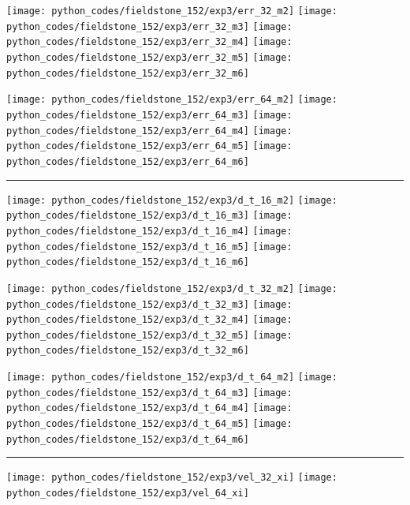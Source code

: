 \noindent
\texttt{[image: python\_codes/fieldstone\_152/exp3/err\_32\_m2]}
\texttt{[image: python\_codes/fieldstone\_152/exp3/err\_32\_m3]}
\texttt{[image: python\_codes/fieldstone\_152/exp3/err\_32\_m4]}
\texttt{[image: python\_codes/fieldstone\_152/exp3/err\_32\_m5]}
\texttt{[image: python\_codes/fieldstone\_152/exp3/err\_32\_m6]}

\noindent
\texttt{[image: python\_codes/fieldstone\_152/exp3/err\_64\_m2]}
\texttt{[image: python\_codes/fieldstone\_152/exp3/err\_64\_m3]}
\texttt{[image: python\_codes/fieldstone\_152/exp3/err\_64\_m4]}
\texttt{[image: python\_codes/fieldstone\_152/exp3/err\_64\_m5]}
\texttt{[image: python\_codes/fieldstone\_152/exp3/err\_64\_m6]}

\hrule

\noindent
\texttt{[image: python\_codes/fieldstone\_152/exp3/d\_t\_16\_m2]}
\texttt{[image: python\_codes/fieldstone\_152/exp3/d\_t\_16\_m3]}
\texttt{[image: python\_codes/fieldstone\_152/exp3/d\_t\_16\_m4]}
\texttt{[image: python\_codes/fieldstone\_152/exp3/d\_t\_16\_m5]}
\texttt{[image: python\_codes/fieldstone\_152/exp3/d\_t\_16\_m6]}

\noindent
\texttt{[image: python\_codes/fieldstone\_152/exp3/d\_t\_32\_m2]}
\texttt{[image: python\_codes/fieldstone\_152/exp3/d\_t\_32\_m3]}
\texttt{[image: python\_codes/fieldstone\_152/exp3/d\_t\_32\_m4]}
\texttt{[image: python\_codes/fieldstone\_152/exp3/d\_t\_32\_m5]}
\texttt{[image: python\_codes/fieldstone\_152/exp3/d\_t\_32\_m6]}

\noindent
\texttt{[image: python\_codes/fieldstone\_152/exp3/d\_t\_64\_m2]}
\texttt{[image: python\_codes/fieldstone\_152/exp3/d\_t\_64\_m3]}
\texttt{[image: python\_codes/fieldstone\_152/exp3/d\_t\_64\_m4]}
\texttt{[image: python\_codes/fieldstone\_152/exp3/d\_t\_64\_m5]}
\texttt{[image: python\_codes/fieldstone\_152/exp3/d\_t\_64\_m6]}

\hrule

\texttt{[image: python\_codes/fieldstone\_152/exp3/vel\_32\_xi]}
\texttt{[image: python\_codes/fieldstone\_152/exp3/vel\_64\_xi]}

